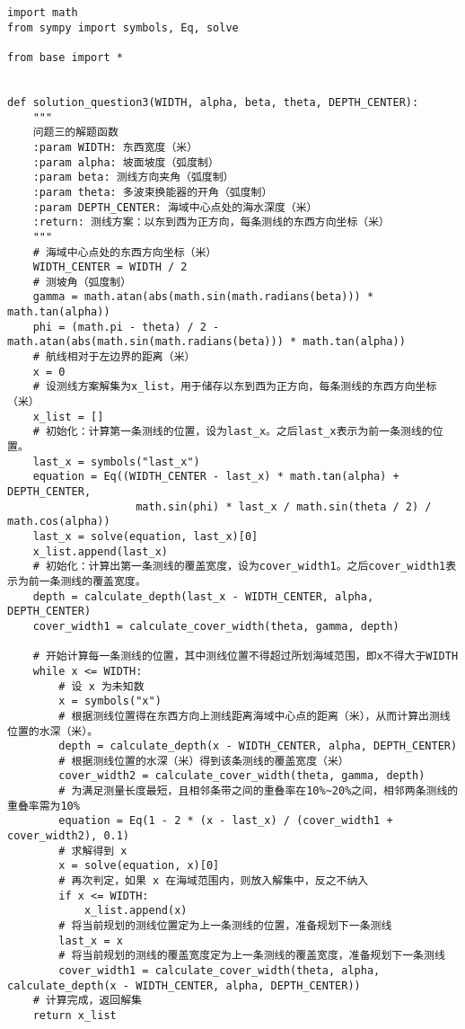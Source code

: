 \begin{lstlisting}[caption={question3.py}]
import math
from sympy import symbols, Eq, solve

from base import *


def solution_question3(WIDTH, alpha, beta, theta, DEPTH_CENTER):
    """
    问题三的解题函数
    :param WIDTH: 东西宽度（米）
    :param alpha: 坡面坡度（弧度制）
    :param beta: 测线方向夹角（弧度制）
    :param theta: 多波束换能器的开角（弧度制）
    :param DEPTH_CENTER: 海域中心点处的海水深度（米）
    :return: 测线方案：以东到西为正方向，每条测线的东西方向坐标（米）
    """
    # 海域中心点处的东西方向坐标（米）
    WIDTH_CENTER = WIDTH / 2
    # 测坡角（弧度制）
    gamma = math.atan(abs(math.sin(math.radians(beta))) * math.tan(alpha))
    phi = (math.pi - theta) / 2 - math.atan(abs(math.sin(math.radians(beta))) * math.tan(alpha))
    # 航线相对于左边界的距离（米）
    x = 0
    # 设测线方案解集为x_list，用于储存以东到西为正方向，每条测线的东西方向坐标（米）
    x_list = []
    # 初始化：计算第一条测线的位置，设为last_x。之后last_x表示为前一条测线的位置。
    last_x = symbols("last_x")
    equation = Eq((WIDTH_CENTER - last_x) * math.tan(alpha) + DEPTH_CENTER,
                    math.sin(phi) * last_x / math.sin(theta / 2) / math.cos(alpha))
    last_x = solve(equation, last_x)[0]
    x_list.append(last_x)
    # 初始化：计算出第一条测线的覆盖宽度，设为cover_width1。之后cover_width1表示为前一条测线的覆盖宽度。
    depth = calculate_depth(last_x - WIDTH_CENTER, alpha, DEPTH_CENTER)
    cover_width1 = calculate_cover_width(theta, gamma, depth)

    # 开始计算每一条测线的位置，其中测线位置不得超过所划海域范围，即x不得大于WIDTH
    while x <= WIDTH:
        # 设 x 为未知数
        x = symbols("x")
        # 根据测线位置得在东西方向上测线距离海域中心点的距离（米），从而计算出测线位置的水深（米）。
        depth = calculate_depth(x - WIDTH_CENTER, alpha, DEPTH_CENTER)
        # 根据测线位置的水深（米）得到该条测线的覆盖宽度（米）
        cover_width2 = calculate_cover_width(theta, gamma, depth)
        # 为满足测量长度最短，且相邻条带之间的重叠率在10%~20%之间，相邻两条测线的重叠率需为10%
        equation = Eq(1 - 2 * (x - last_x) / (cover_width1 + cover_width2), 0.1)
        # 求解得到 x
        x = solve(equation, x)[0]
        # 再次判定，如果 x 在海域范围内，则放入解集中，反之不纳入
        if x <= WIDTH:
            x_list.append(x)
        # 将当前规划的测线位置定为上一条测线的位置，准备规划下一条测线
        last_x = x
        # 将当前规划的测线的覆盖宽度定为上一条测线的覆盖宽度，准备规划下一条测线
        cover_width1 = calculate_cover_width(theta, alpha, calculate_depth(x - WIDTH_CENTER, alpha, DEPTH_CENTER))
    # 计算完成，返回解集
    return x_list



\end{lstlisting}
